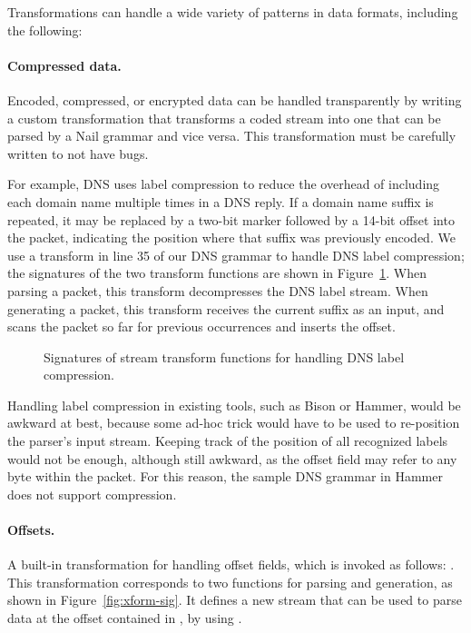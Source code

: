 Transformations can handle a wide variety of patterns in data formats, including the following: 

\paragraph{Compressed data.}
Encoded, compressed, or encrypted data can be handled transparently by writing a custom
transformation that transforms a coded stream into one that can be parsed by a Nail grammar and vice
versa. This transformation must be carefully written to not have bugs. 

For example, DNS uses label compression to reduce the overhead of including each domain name
multiple times in a DNS reply. If a domain name suffix is repeated, it may be replaced by a two-bit
marker followed by a  14-bit offset into the packet, indicating the position where that suffix was
previously encoded.  We use a transform in line 35
of our DNS grammar to handle DNS label compression; the signatures of the two transform functions are shown
in Figure~\ref{fig:dns-xform}.  When parsing a packet, this transform
decompresses the DNS label stream.
When generating a packet, this transform receives the current suffix as
an input, and scans the packet so far for previous occurrences and inserts the offset.

\begin{figure}
\smaller[0.5]

\caption{Signatures of stream transform functions for handling DNS label compression.}
\label{fig:dns-xform}
\end{figure}
Handling label compression in existing tools, such as Bison or Hammer,
would be awkward at best, because some ad-hoc trick would have to
be used to re-position the parser's input stream.  Keeping track of the
position of all recognized labels would not be enough, although still awkward, as the offset field
may refer to any byte within the packet.
For this reason, the sample DNS grammar in Hammer does not
support compression.

\paragraph{Offsets.}
A built-in transformation for handling offset fields, which is invoked as follows:
. 
This transformation corresponds to two functions for parsing and
generation, as shown in Figure~\ref{fig:xform-sig}. It defines a new stream  that can
be used to parse data at the offset contained in , by
using .



